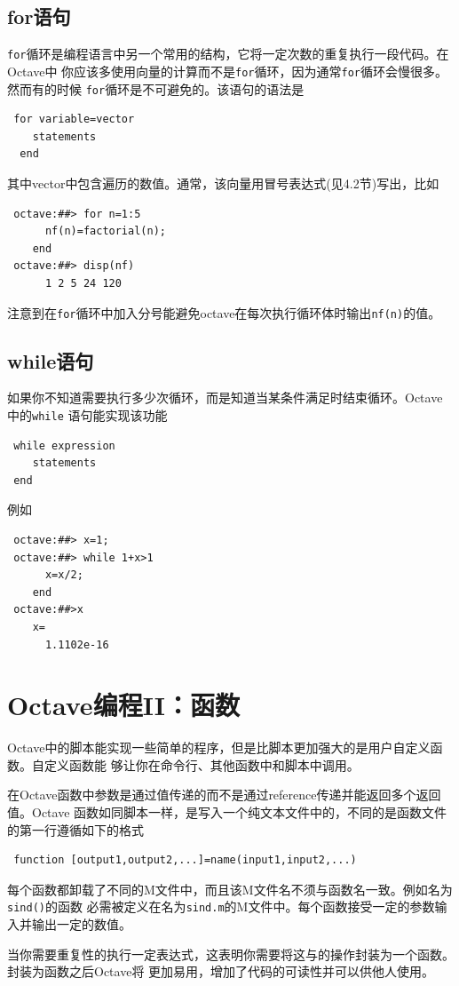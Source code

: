 \documentclass[UTF8,adobefonts]{ctexart}
\begin{document}
\subsection{{\bf for}语句}
{\tt for}循环是编程语言中另一个常用的结构，它将一定次数的重复执行一段代码。在Octave中
你应该多使用向量的计算而不是{\tt for}循环，因为通常{\tt for}循环会慢很多。然而有的时候
{\tt for}循环是不可避免的。该语句的语法是
\begin{verbatim}
 for variable=vector
    statements
  end
\end{verbatim}
其中{vector}中包含遍历的数值。通常，该向量用冒号表达式(见4.2节)写出，比如
\begin{verbatim}
 octave:##> for n=1:5
      nf(n)=factorial(n);
    end
 octave:##> disp(nf)
      1 2 5 24 120
\end{verbatim}
注意到在{\tt for}循环中加入分号能避免octave在每次执行循环体时输出{\tt nf(n)}的值。
\subsection{{\bf while}语句}
如果你不知道需要执行多少次循环，而是知道当某条件满足时结束循环。Octave中的{\tt while}
语句能实现该功能
\begin{verbatim}
 while expression
    statements
 end
\end{verbatim}
例如
\begin{verbatim}
 octave:##> x=1;
 octave:##> while 1+x>1
      x=x/2;
    end
 octave:##>x
    x=
      1.1102e-16
\end{verbatim}
\section{Octave编程II：函数}
Octave中的脚本能实现一些简单的程序，但是比脚本更加强大的是用户自定义函数。自定义函数能
够让你在命令行、其他函数中和脚本中调用。

在Octave函数中参数是通过值传递的而不是通过reference传递并能返回多个返回值。Octave
函数如同脚本一样，是写入一个纯文本文件中的，不同的是函数文件的第一行遵循如下的格式
\begin{verbatim}
 function [output1,output2,...]=name(input1,input2,...)
\end{verbatim}
每个函数都卸载了不同的M文件中，而且该M文件名不须与函数名一致。例如名为{\tt sind()}的函数
必需被定义在名为{\tt sind.m}的M文件中。每个函数接受一定的参数输入并输出一定的数值。
  
当你需要重复性的执行一定表达式，这表明你需要将这与的操作封装为一个函数。封装为函数之后Octave将
更加易用，增加了代码的可读性并可以供他人使用。
\end{document}
